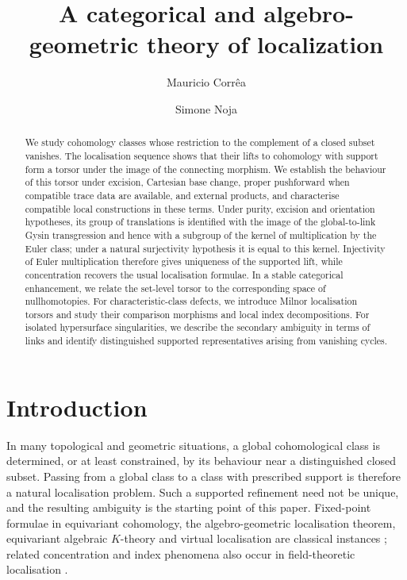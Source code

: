\documentclass[10pt,a4paper,dvipsnames,x11names]{amsart}
\title{A categorical and algebro-geometric theory of localization}
\author{Mauricio Corr\^ea}
\author{Simone Noja}
\date{}
\numberwithin{equation}{section}
\theoremstyle{plain}
\theoremstyle{definition}
\theoremstyle{remark}
\begin{document}
 

\begin{abstract}
We study cohomology classes whose restriction to the complement of a closed subset vanishes. The localisation sequence shows that their lifts to cohomology with support form a torsor under the image of the connecting morphism. We establish the behaviour of this torsor under excision, Cartesian base change, proper pushforward when compatible trace data are available, and external products, and characterise compatible local constructions in these terms. Under purity, excision and orientation hypotheses, its group of translations is identified with the image of the global-to-link Gysin transgression and hence with a subgroup of the kernel of multiplication by the Euler class; under a natural surjectivity hypothesis it is equal to this kernel. Injectivity of Euler multiplication therefore gives uniqueness of the supported lift, while concentration recovers the usual localisation formulae. In a stable categorical enhancement, we relate the set-level torsor to the corresponding space of nullhomotopies. For characteristic-class defects, we introduce Milnor localisation torsors and study their comparison morphisms and local index decompositions. For isolated hypersurface singularities, we describe the secondary ambiguity in terms of links and identify distinguished supported representatives arising from vanishing cycles.
\end{abstract}

\maketitle


\section{Introduction}\label{sec:intro}

In many topological and geometric situations, a global cohomological class is determined, or at least constrained, by its behaviour near a distinguished closed subset. Passing from a global class to a class with prescribed support is therefore a natural localisation problem. Such a supported refinement need not be unique, and the resulting ambiguity is the starting point of this paper. Fixed-point formulae in equivariant cohomology, the algebro-geometric localisation theorem, equivariant algebraic $K$-theory and virtual localisation are classical instances \cite{AB,BV,EG,Thomason,GP}; related concentration and index phenomena also occur in field-theoretic localisation \cite{PestunS4,PestunZabzine}.
\end{document}
